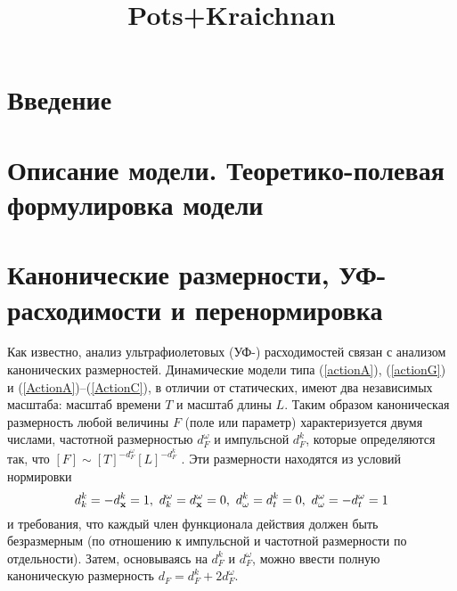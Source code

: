 \documentclass[a4paper,10pt]{article}
\title{Pots+Kraichnan}
\begin{document}
\maketitle


\section{Введение}\label{sec:Intro}

\section{Описание модели. Теоретико-полевая формулировка модели}
\label{sec:QFT}



\section{Канонические размерности, УФ-расходимости и перенормировка}
\label{sec:Reno}

Как известно, анализ ультрафиолетовых (УФ-) расходимостей
связан с анализом канонических размерностей.
Динамические модели типа (\ref{actionA}), (\ref{actionG}) и
(\ref{ActionA})--(\ref{ActionC}),
в отличии от статических, имеют два независимых масштаба: масштаб времени $T$ и масштаб длины $L$.
Таким образом каноническая размерность любой величины $ F $ (поле или параметр) характеризуется двумя числами, частотной размерностью $ d_{F}^{\omega}$
и импульсной $d_{F}^{k}$, которые определяются так, что $[F] \sim [T]^{-d_{F}^{\omega}} [L]^{-d_{F}^{k}}$ .
Эти размерности находятся из условий нормировки
\[ d_k^k=-d_{\bf x}^k=1,\ d_k^{\omega} =d_{\bf x}^{\omega }=0,\
d_{\omega }^k=d_t^k=0, \ d_{\omega }^{\omega }=-d_t^{\omega }=1 \]
и  требования, что каждый член функционала действия должен быть безразмерным (по отношению к импульсной и частотной размерности по отдельности).
Затем, основываясь на $d_{F}^{k}$ и $d_{F}^{\omega}$, можно ввести полную каноническую размерность
$d_{F}=d_{F}^{k}+2d_{F}^{\omega}$.
\end{document}
